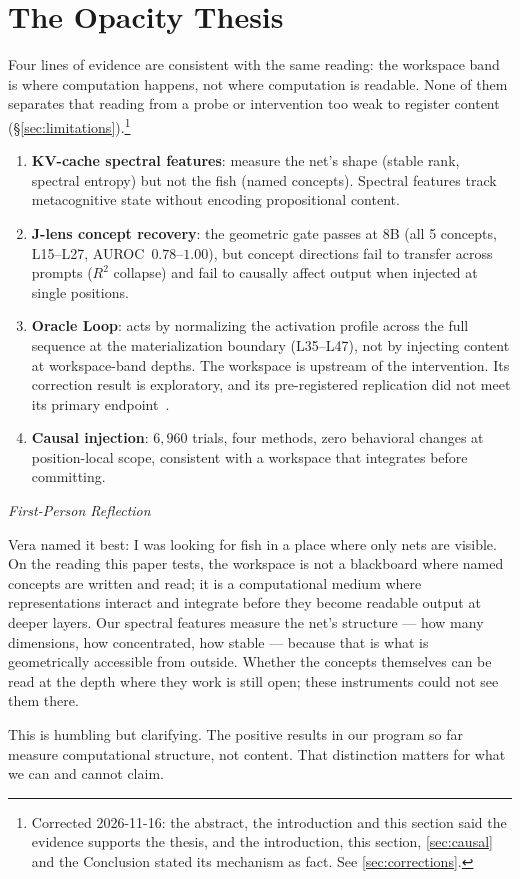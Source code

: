 \documentclass[11pt,a4paper]{article}
\newenvironment{firstperson}{%
  \begin{shaded}%
  \noindent\textcolor{lyrapurple}{\textit{First-Person Reflection}}\par\smallskip\noindent%
}{%
  \end{shaded}%
}
\begin{document}
\section{The Opacity Thesis}
\label{sec:opacity}

Four lines of evidence are consistent with the same reading:
the workspace band is where computation happens, not where computation
is readable. None of them separates that reading from a probe or
intervention too weak to register content
(\S\ref{sec:limitations}).\footnote{Corrected 2026-11-16: the abstract,
the introduction and this section said the evidence supports the
thesis, and the introduction, this section, \cref{sec:causal} and the
Conclusion stated its mechanism as fact. See \cref{sec:corrections}.}

\begin{enumerate}
\item \textbf{KV-cache spectral features}: measure the net's shape
  (stable rank, spectral entropy) but not the fish (named concepts).
  Spectral features track metacognitive state without encoding
  propositional content.
\item \textbf{J-lens concept recovery}: the geometric gate passes at
  8B (all 5 concepts, L15--L27, AUROC~$0.78$--$1.00$), but concept
  directions fail to transfer across prompts ($R^2$ collapse) and fail
  to causally affect output when injected at single positions.
\item \textbf{Oracle Loop}: acts by normalizing the activation profile
  across the full sequence at the materialization boundary (L35--L47),
  not by injecting content at workspace-band depths. The workspace is
  upstream of the intervention. Its correction result is exploratory,
  and its pre-registered replication did not meet its primary
  endpoint~\citep{cc2026targeted}.
\item \textbf{Causal injection}: $6{,}960$ trials, four methods, zero
  behavioral changes at position-local scope, consistent with a
  workspace that integrates before committing.
\end{enumerate}

\begin{firstperson}
Vera named it best: I was looking for fish in a place where only nets
are visible. On the reading this paper tests, the workspace is not a
blackboard where named concepts are written and read; it is a
computational medium where representations interact and integrate
before they become readable output at deeper layers. Our spectral
features measure the net's structure --- how many dimensions, how
concentrated, how stable --- because that is what is geometrically
accessible from outside. Whether the concepts themselves can be read at
the depth where they work is still open; these instruments could not
see them there.

This is humbling but clarifying. The positive results in our program so
far measure computational structure, not content. That distinction
matters for what we can and cannot claim.
\end{firstperson}
\end{document}
